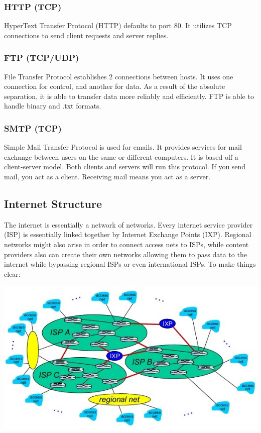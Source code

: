 \documentclass{article}
\begin{document}
\subsubsection{HTTP (TCP)}
HyperText Transfer Protocol (HTTP) defaults to port 80. It utilizes TCP connections to send client requests and server replies.

\subsubsection{FTP (TCP/UDP)}
File Transfer Protocol establishes 2 connections between hosts. It uses one connection for control, and another for data. As a result of the absolute separation, it is able to transfer data more reliably and efficiently. FTP is able to handle binary and .txt formats.

\subsubsection{SMTP (TCP)}
Simple Mail Transfer Protocol is used for emails. It provides services for mail exchange between users on the same or different computers. It is based off a client-server model. Both clients and servers will run this protocol. If you send mail, you act as a client. Receiving mail means you act as a server.

\subsection{Internet Structure}
The internet is essentially a network of networks. Every internet service provider (ISP) is essentially linked together by Internet Exchange Points (IXP). Regional networks might also arise in order to connect access nets to ISPs, while content providers also can create their own networks allowing them to pass data to the internet while bypassing regional ISPs or even international ISPs. To make things clear:

\begin{center}
\includegraphics[width=\textwidth]{ISPtiers.jpg}
\end{center}
\end{document}
